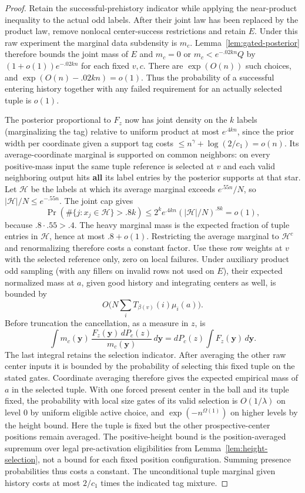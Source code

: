\begin{proof}
Retain the successful-prehistory indicator while applying the
near-product inequality to the actual odd labels. After their joint law
has been replaced by the product law, remove nonlocal center-success
restrictions and retain \(E\). Under this raw experiment the marginal
data subdensity is \(m_c\). Lemma~\ref{lem:gated-posterior} therefore
bounds the joint mass of \(E\) and
\(m_c=0\) or \(m_c<e^{-.02kn}Q\) by
\((1+o(1))e^{-.02kn}\) for each fixed \(v,c\).
There are \(\exp(O(n))\) such choices, and
\(\exp(O(n)-.02kn)=o(1)\). Thus the probability of a successful
entering history together with any failed requirement for an actually
selected tuple is \(o(1)\).

The posterior proportional to \(F_z\) now has joint density on the \(k\) labels (marginalizing the tag) relative to uniform product at most \(e^{.4kn}\), since the prior width per coordinate given a support tag costs \(\le n^\gamma+\log(2/c_1)=o(n)\). Its average-coordinate marginal is supported on common neighbors: on every positive-mass input the same tuple reference is selected at \(v\) and each valid neighboring output hits \textbf{all} its label entries by the posterior supports at that star. Let \(\mathcal H\) be the labels at which its average marginal exceeds
\(e^{.55n}/N\), so \(|\mathcal H|/N\le e^{-.55n}\).
The joint cap gives
\[
 \Pr(\#\{j:x_j\in\mathcal H\}>.8k)
 \le 2^k e^{.4kn}(|\mathcal H|/N)^{.8k}=o(1),
\]
because \(.8\cdot.55>.4\).
The heavy marginal mass is the expected fraction of tuple entries in
\(\mathcal H\), hence at most \(.8+o(1)\). Restricting the average marginal to
\(\mathcal H^c\) and renormalizing therefore costs a constant factor. Use these row weights at \(v\) with the selected reference only, zero on local failures. Under auxiliary product odd sampling (with any fillers on invalid rows not used on \(E\)), their expected normalized mass at \(a\), given good history and integrating centers as well, is bounded by
\[
 O\Big(N\sum_i T_{\beta(v)}(i)\mu_i(a)\Big).
\]
Before truncation the cancellation, as a measure in \(z\), is
\[
 \int m_c(\mathbf y)\,
       \frac{F_z(\mathbf y)\,dP_c(z)}{m_c(\mathbf y)}\,d\mathbf y
 =dP_c(z)\int F_z(\mathbf y)\,d\mathbf y.
\]
The last integral retains the selection indicator. After averaging the
other raw center inputs it is bounded by the probability of selecting
this fixed tuple on the stated gates. Coordinate averaging therefore
gives the expected empirical mass of \(a\) in the selected tuple. With one forced present center in the ball and its tuple fixed, the probability with local size gates of its valid selection is \(O(1/\lambda)\) on level 0 by uniform eligible active choice, and \(\exp(-n^{\Omega(1)})\) on higher levels by the height bound. Here the tuple is fixed but the other prospective-center positions
remain averaged. The positive-height bound is the position-averaged
supremum over legal pre-activation eligibilities from
Lemma~\ref{lem:height-selection}, not a bound for each fixed position
configuration. Summing presence probabilities thus costs a constant. The unconditional tuple marginal given history costs at most \(2/c_1\) times the indicated tag mixture.


\end{proof}
